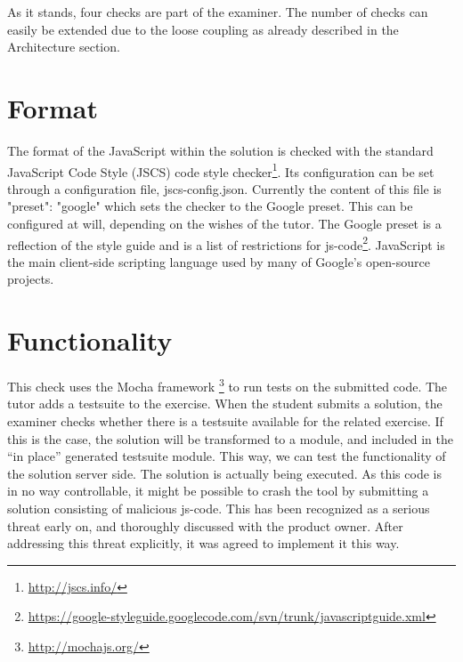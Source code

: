 % 

As it stands, four checks are part of the \gls{examiner}.
The number of checks can easily be extended due to the loose coupling as already
described in the Architecture section.

\section{Format}

The format of the JavaScript within the solution is checked with the standard
JavaScript Code Style (JSCS) code style checker\footnote{\url{http://jscs.info/}}.
Its configuration can be set through a configuration file, jscs-config.json.
Currently the content of this file is {"preset": "google"} which sets the checker
to the Google preset.
This can be configured at will, depending on the wishes of the tutor.
The Google preset is a reflection of the style guide and is a list of restrictions
for \gls{js-code}\footnote{\url{https://google-styleguide.googlecode.com/svn/trunk/javascriptguide.xml}}.
JavaScript is the main client-side scripting language used by many of Google's
open-source projects.


\section{Functionality}

This \gls{check} uses the Mocha framework \footnote{\url{http://mochajs.org/}} 
to run tests on the submitted code. The \gls{tutor} adds a testsuite to the
exercise. When the \gls{student} submits a \gls{solution}, the \gls{examiner}
checks whether there is a testsuite available for the related \gls{exercise}.
If this is the case, the \gls{solution} will be transformed to a module, and
included in the ``in place'' generated testsuite module. This way, we can test
the functionality of the \gls{solution} server side. The \gls{solution} is
actually being executed. As this code is in no way controllable, it might be
possible to crash the tool by submitting a \gls{solution} consisting of 
malicious \gls{js-code}. This has been recognized as a serious threat early on,
and thoroughly discussed with the product owner. After addressing this threat 
explicitly, it was agreed to implement it this way.

